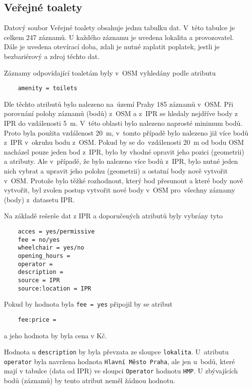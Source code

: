 \subsection{Veřejné toalety}
\label{Veřejné toalety}
Datový soubor Veřejné toalety obsahuje jednu tabulku dat. V~této
tabulce je celkem 247 záznamů. U každého záznamu je uvedena lokalita a
provozovatel. Dále je uvedena otevírací doba, zdali je
nutné zaplatit poplatek, jestli je bezbariérový a zdroj těchto dat.

Záznamy odpovídající toaletám byly v~OSM vyhledány podle atributu
\begin{verbatim}
    amenity = toilets
\end{verbatim}

Dle těchto atributů bylo nalezeno na~území Prahy 185 záznamů v~OSM. Při porovnání polohy záznamů (bodů) z~OSM a z~IPR
se hledaly nejdříve body z IPR do vzdálenosti 5~m. V~této oblasti bylo nalezeno naprosté minimum bodů.
Proto byla použita vzdálenost 20~m, v~tomto případě bylo nalezeno již více bodů z~IPR v~okruhu bodu z~OSM.
Pokud by se do~vzdálenosti 20~m od bodu OSM nacházel pouze jeden bod z~IPR, bylo by vhodné opravit jeho pozici (geometrii) a atributy.
Ale v~případě, že bylo nalezeno více bodů z~IPR, bylo nutné jeden nich vybrat
a upravit jeho polohu (geometrii) a ostatní body nově vytvořit v~OSM.
Protože bylo těžké rozhodnout, který bod přesunout a které body nově vytvořit,
byl zvolen postup vytvořit nové body v~OSM pro~všechny záznamy (body) z~datasetu IPR.

Na základě rešerše dat z IPR a doporučených atributů byly vybrány tyto
\begin{verbatim}
    acces = yes/permissive
    fee = no/yes
    wheelchair = yes/no
    opening_hours =
    operator =
    description =
    source = IPR
    source:location = IPR
\end{verbatim}
Pokud by hodnota byla {\tt fee~=~yes} připojil by se atribut
\begin{verbatim}
    fee:price =
\end{verbatim}
a jeho hodnota by byla cena v Kč.

Hodnota u {\tt description} by byla převzata ze sloupce
{\tt lokalita}. U~atributu {\tt operator} byla navržena hodnota
{\tt Hlavní Město Praha}, ale jen u~bodů, které mají v tabulce
(data od IPR) ve sloupci {\tt Operator} hodnotu {\tt HMP}.
U zbývajících bodů (záznamů) by tento atribut neměl žádnou hodnotu.


